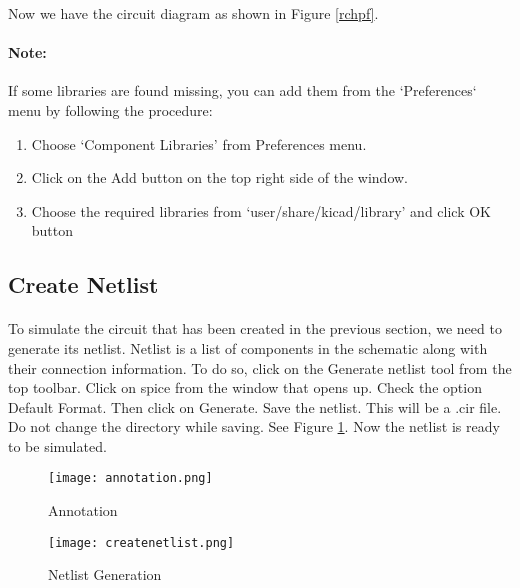 Now we have the circuit diagram as shown in Figure \ref{rchpf}.


\paragraph{Note:} If some libraries are found missing, you can add them from the `Preferences` menu by following the procedure: 

\begin{enumerate}
\item
Choose `Component Libraries' from Preferences menu.

\item
Click on the Add button on the top right side of the window.

\item
Choose the required libraries from `user/share/kicad/library' and click OK button

\end{enumerate}

\subsection{Create Netlist}

\paragraph{}To simulate the circuit that has been created in the previous section, we need to generate
its netlist. Netlist is a list of components in the schematic along with their connection
information. To do so, click on the Generate netlist tool from the top toolbar. Click on
spice from the window that opens up. Check the option Default Format. Then click
on Generate. Save the netlist. This will be a .cir file. Do
not change the directory while saving. See Figure \ref{createnetlist}.
 Now the netlist is ready to be simulated. 
\begin{figure}
\begin{minipage}{.5\textwidth}
  \centering
  \texttt{[image: annotation.png]}
  \caption{Annotation}
  \label{annotation}
\end{minipage}%
\begin{minipage}{.5\textwidth}
  \centering
  \texttt{[image: createnetlist.png]}
  \caption{Netlist Generation}
  \label{createnetlist}
\end{minipage}
\end{figure}

